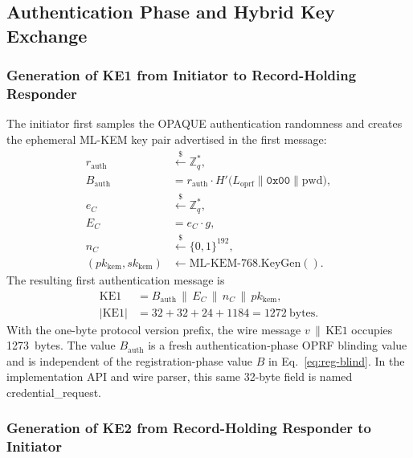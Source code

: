 \documentclass{ieeeijc}
\newcommand{\Label}[1]{L_{\mathrm{#1}}}
\newcommand{\codeid}[1]{\textsf{#1}}
\theoremstyle{remark}
\begin{document}
\subsection{Authentication Phase and Hybrid Key Exchange}

\subsubsection{Generation of KE1 from Initiator to Record-Holding Responder}

The initiator first samples the OPAQUE authentication randomness and creates
the ephemeral ML-KEM key pair advertised in the first message:
\begin{equation}
  \begin{aligned}
    r_{\mathrm{auth}} &\xleftarrow{\$} \mathbb{Z}_q^*,\\
    B_{\mathrm{auth}} &=
        r_{\mathrm{auth}} \cdot
        H'\!\bigl(\Label{oprf} \| \mathtt{0x00} \| \mathrm{pwd}\bigr),\\
    e_C &\xleftarrow{\$} \mathbb{Z}_q^*,\\
    E_C &= e_C \cdot g,\\
    n_C &\xleftarrow{\$} \{0,1\}^{192},\\
    (pk_{\mathrm{kem}},sk_{\mathrm{kem}})
        &\leftarrow \mathrm{ML\text{-}KEM\text{-}768.KeyGen}().
  \end{aligned}
\end{equation}
The resulting first authentication message is
\begin{equation}
  \begin{aligned}
    \mathrm{KE1}
      &= B_{\mathrm{auth}} \,\|\, E_C \,\|\, n_C \,\|\, pk_{\mathrm{kem}},\\
    |\mathrm{KE1}|
      &= 32 + 32 + 24 + 1184
       = 1272~\text{bytes}.
  \end{aligned}
\end{equation}
With the one-byte protocol version prefix, the wire message
$v \,\|\, \mathrm{KE1}$ occupies 1273~bytes.
The value $B_{\mathrm{auth}}$ is a fresh authentication-phase OPRF
blinding value and is independent of the registration-phase value $B$ in
Eq.~\eqref{eq:reg-blind}. In the implementation API and wire parser,
this same 32-byte field is named \codeid{credential\_request}.

\subsubsection{Generation of KE2 from Record-Holding Responder to Initiator}
\end{document}
